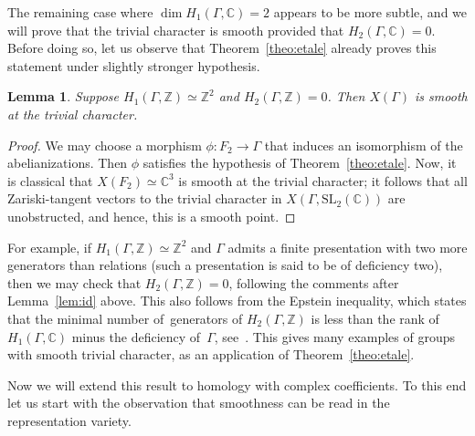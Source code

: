 \documentclass[JEP,XML,SOM,Unicode,NoEqCountersInSection]{cedram}
\newtheorem{lemma}[theorem]{Lemma}
\theoremstyle{definition}
\newcommand{\ZZ}{\mathbb{Z}}
\newcommand{\CC}{\mathbb{C}}
\newcommand{\SL}{\mathrm{SL}}
\begin{document}
The remaining case where $\dim H_1(\Gamma,\CC)=2$ appears to be more subtle,
and we will prove that the trivial character is smooth provided that
$H_2(\Gamma,\CC)=0$. Before doing so, let us observe that
Theorem~\ref{theo:etale} already proves this statement under slightly
stronger hypothesis.
\begin{lemma}
Suppose $H_1(\Gamma,\ZZ)\simeq\ZZ^2$ and $H_2(\Gamma,\ZZ)=0$.
Then $X(\Gamma)$ is smooth at the trivial character.
\end{lemma}
\begin{proof}
We may choose a morphism $\phi\colon F_2\to\Gamma$ that induces an
isomorphism of the abelianizations. Then $\phi$ satisfies the hypothesis
of Theorem~\ref{theo:etale}. Now, it is classical that $X(F_2)\simeq\CC^3$
is smooth at the trivial character; it follows that all Zariski-tangent
vectors to the trivial character in $X(\Gamma,\SL_2(\CC))$ are unobstructed,
and hence, this is a smooth point.
\end{proof}
For example, if $H_1(\Gamma,\ZZ)\simeq\ZZ^2$ and $\Gamma$ admits a finite
presentation with two more generators than relations (such a presentation
is said to be of deficiency two), then we may check that $H_2(\Gamma,\ZZ)=0$,
following the comments after Lemma~\ref{lem:id} above.
This also follows from the Epstein inequality, which
states
that the minimal \hbox{number} of~\hbox{generators} of $H_2(\Gamma,\ZZ)$ is less than the
rank of $H_1(\Gamma,\CC)$ minus the deficiency of~$\Gamma$, see~\cite{Epstein}.
This gives many examples of groups with smooth trivial character, as an
application of Theorem~\ref{theo:etale}.

Now we will extend this result to homology with complex coefficients. To this
end let us start with the observation that smoothness can be read in the
representation variety.
\end{document}
